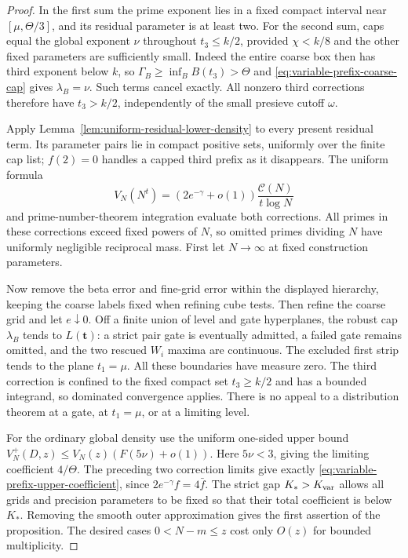 \documentclass[11pt]{article}
\newcommand{\CN}{\mathcal C(N)}
\begin{document}
\begin{proof}
In the first sum the prime exponent lies in a fixed compact
interval near $[\mu,\Theta/3]$, and its residual parameter is at
least two. For the second sum, caps equal the global exponent
$\nu$ throughout $t_3\le k/2$, provided $\chi<k/8$ and the
other fixed parameters are sufficiently small. Indeed the entire
coarse box then has third exponent below $k$, so
$\Gamma_B\ge\inf_BB(t_3)>\Theta$ and
\eqref{eq:variable-prefix-coarse-cap} gives $\lambda_B=\nu$.
Such terms cancel exactly. All nonzero third corrections therefore
have $t_3>k/2$, independently of the small presieve cutoff $\omega$.

Apply Lemma~\ref{lem:uniform-residual-lower-density} to every
present residual term. Its parameter pairs lie in compact positive
sets, uniformly over the finite cap list; $f(2)=0$ handles a capped
third prefix as it disappears. The uniform formula
\[
 V_N(N^t)=(2e^{-\gamma}+o(1))\frac{\CN}{t\log N}
\]
and prime-number-theorem integration evaluate both corrections.
All primes in these corrections exceed fixed powers of $N$,
so omitted primes dividing $N$ have uniformly negligible reciprocal
mass. First let $N\to\infty$ at fixed construction parameters.

Now remove the beta error and fine-grid error within the displayed
hierarchy, keeping the coarse labels fixed when refining cube tests.
Then refine the coarse grid and let $e\downarrow0$.
Off a finite union of level and gate hyperplanes, the robust cap
$\lambda_B$ tends to $L(\boldsymbol t)$: a strict pair gate is
eventually admitted, a failed gate remains omitted, and the two
rescued $W_i$ maxima are continuous. The excluded first strip tends
to the plane $t_1=\mu$. All these boundaries have measure zero.
The third correction is confined to the fixed compact set
$t_3\ge k/2$ and has a bounded integrand, so dominated convergence
applies. There is no appeal to a distribution theorem at a gate,
at $t_1=\mu$, or at a limiting level.

For the ordinary global density use the uniform one-sided upper
bound $V_N^+(D,z)\le V_N(z)(F(5\nu)+o(1))$.
Here $5\nu<3$, giving the limiting coefficient $4/\Theta$.
The preceding two correction limits give exactly
\eqref{eq:variable-prefix-upper-coefficient}, since
$2e^{-\gamma}f=4\bar f$.
The strict gap $K_*>K_{\rm var}$ allows all grids and precision
parameters to be fixed so that their total coefficient is below
$K_*$. Removing the smooth outer approximation gives the first
assertion of the proposition. The desired cases $0<N-m\le z$
cost only $O(z)$ for bounded multiplicity.


\end{proof}
\end{document}
